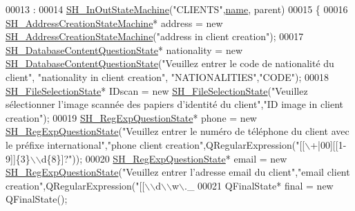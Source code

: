 \begin{DoxyCode}
00013                                                                                           :
00014     \hyperlink{classSH__InOutStateMachine_abd780037922920c674b43d80c2b50d16}{SH\_InOutStateMachine}(\textcolor{stringliteral}{"CLIENTS"},\hyperlink{classSH__NamedObject_a970f265df31b28b2179bbbceb6170ac2}{name}, parent)
00015 \{
00016     \hyperlink{classSH__AddressCreationStateMachine}{SH\_AddressCreationStateMachine}* address = \textcolor{keyword}{new} 
      \hyperlink{classSH__AddressCreationStateMachine}{SH\_AddressCreationStateMachine}(\textcolor{stringliteral}{"address in client creation"});
00017     \hyperlink{classSH__DatabaseContentQuestionState}{SH\_DatabaseContentQuestionState}* nationality = \textcolor{keyword}{new} 
      \hyperlink{classSH__DatabaseContentQuestionState}{SH\_DatabaseContentQuestionState}(\textcolor{stringliteral}{"Veuillez entrer le code de nationalité du
       client"}, \textcolor{stringliteral}{"nationality in client creation"}, \textcolor{stringliteral}{"NATIONALITIES"},\textcolor{stringliteral}{"CODE"});
00018     \hyperlink{classSH__FileSelectionState}{SH\_FileSelectionState}* IDscan = \textcolor{keyword}{new} 
      \hyperlink{classSH__FileSelectionState}{SH\_FileSelectionState}(\textcolor{stringliteral}{"Veuillez sélectionner l'image scannée des papiers d'identité du
       client"},\textcolor{stringliteral}{"ID image in client creation"});
00019     \hyperlink{classSH__RegExpQuestionState}{SH\_RegExpQuestionState}* phone = \textcolor{keyword}{new} 
      \hyperlink{classSH__RegExpQuestionState}{SH\_RegExpQuestionState}(\textcolor{stringliteral}{"Veuillez entrer le numéro de téléphone du client avec le
       préfixe international"},\textcolor{stringliteral}{"phone client creation"},QRegularExpression(\textcolor{stringliteral}{"[[\(\backslash\)+|00][[1-9]]\{3\}\(\backslash\)\(\backslash\)d\{8\}]?"}));
00020     \hyperlink{classSH__RegExpQuestionState}{SH\_RegExpQuestionState}* email = \textcolor{keyword}{new} 
      \hyperlink{classSH__RegExpQuestionState}{SH\_RegExpQuestionState}(\textcolor{stringliteral}{"Veuillez entrer l'adresse email du client"},\textcolor{stringliteral}{"email client
       creation"},QRegularExpression(\textcolor{stringliteral}{"[[\(\backslash\)\(\backslash\)d\(\backslash\)\(\backslash\)w\(\backslash\).\_%
00021     QFinalState* \textcolor{keyword}{final} = \textcolor{keyword}{new} QFinalState();
}
\end{DoxyCode}
